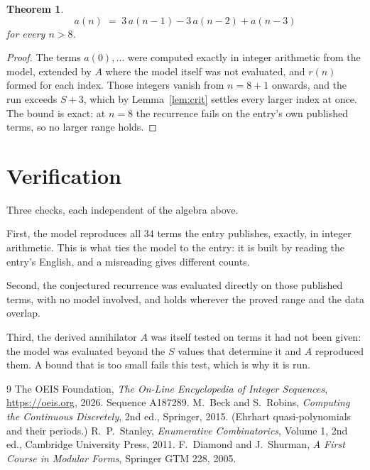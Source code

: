 \documentclass[11pt,a4paper]{article}
\theoremstyle{plain}
\newtheorem{theorem}{Theorem}
\theoremstyle{definition}
\begin{document}
\begin{theorem}
\[
a(n)\;=\;3\,a(n-1) - 3\,a(n-2) + a(n-3)
\]
for every $n>8$.
\end{theorem}

\begin{proof}
The terms $a(0),\dots$ were computed exactly in integer arithmetic from the model, extended by
$A$ where the model itself was not evaluated, and $r(n)$ formed for each index. Those integers
vanish from $n=8+1$ onwards, and the run exceeds $S+3$, which by
Lemma~\ref{lem:crit} settles every larger index at once. The bound is exact: at $n=8$ the recurrence fails on the entry's own published terms, so no larger range holds.
\end{proof}

\section{Verification}

Three checks, each independent of the algebra above.

First, the model reproduces all $34$ terms the entry publishes, exactly, in integer
arithmetic. This is what ties the model to the entry: it is built by reading the entry's
English, and a misreading gives different counts.

Second, the conjectured recurrence was evaluated directly on those published terms, with no
model involved, and holds wherever the proved range and the data overlap.

Third, the derived annihilator $A$ was itself tested on terms it had not been given: the model
was evaluated beyond the $S$ values that determine it and $A$ reproduced them. A bound that is
too small fails this test, which is why it is run.

\begin{thebibliography}{9}
 The OEIS Foundation, \emph{The On-Line Encyclopedia of Integer
Sequences}, \url{https://oeis.org}, 2026. Sequence A187289.
 M.~Beck and S.~Robins, \emph{Computing the Continuous Discretely},
2nd ed., Springer, 2015. (Ehrhart quasi-polynomials and their periods.)
 R.~P.~Stanley, \emph{Enumerative Combinatorics}, Volume 1, 2nd ed.,
Cambridge University Press, 2011.
 F.~Diamond and J.~Shurman, \emph{A First Course in Modular Forms},
Springer GTM 228, 2005.
\end{thebibliography}
\end{document}
